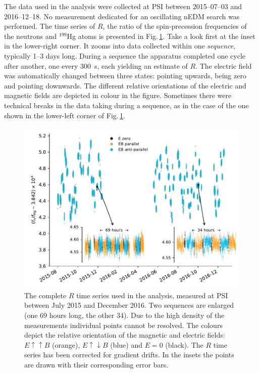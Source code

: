 The data used in the analysis were collected at PSI between 2015--07--03 and 2016--12--18.
No measurement dedicated for an oscillating nEDM search was performed. The time series of $R$, the ratio of the spin-precession frequencies of the neutrons and ${}^{199}$Hg atoms is presented in Fig.\,\ref{fig:PSI_dataset_time_domain}.
Take a look first at the inset in the lower-right corner. It zooms into data collected within one \emph{sequence}, typically 1--3 days long.
During a sequence the apparatus completed one cycle after another, one every \SI{300}{\second}, each yielding an estimate of $R$.
The electric field was automatically changed between three states: pointing upwards, being zero and pointing downwards. The different relative orientations of the electric and magnetic fields are depicted in colour in the figure. Sometimes there were technical breaks in the data taking during a sequence, as in the case of the one shown in the lower-left corner of Fig.\,\ref{fig:PSI_dataset_time_domain}.

\begin{figure}
  \centering
  \includegraphics[width=\linewidth]{gfx/axions/deltah4mm_time_domain_inset_no_yerr.pdf}
  \caption{The complete $R$ time series used in the analysis, measured at PSI between July 2015 and December 2016. Two sequences are enlarged (one 69 hours long, the other 34). Due to the high density of the measurements individual points cannot be resolved. The colours depict the relative orientation of the magnetic and electric fields: $E \uparrow \uparrow B$ (orange), $E \uparrow \downarrow B$ (blue) and $E=0$ (black). The $R$ time series has been corrected for gradient drifts. In the insets the points are drawn with their corresponding error bars.}\label{fig:PSI_dataset_time_domain}
\end{figure}

